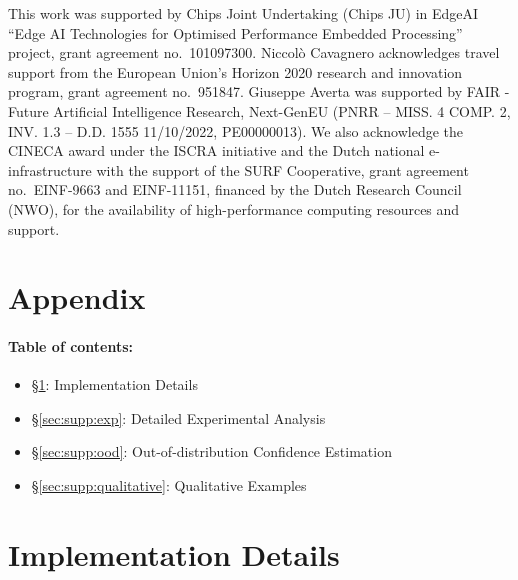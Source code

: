 \documentclass[10pt,twocolumn,letterpaper]{article}
\newcommand{\PAR}[1]{\vskip4pt \noindent {\bf #1~}}
\begin{document}
\footnotesize 
\PAR{Acknowledgements.}
This work was supported by Chips Joint Undertaking (Chips JU) in EdgeAI ``Edge AI Technologies for Optimised Performance Embedded Processing'' project, grant agreement no.~101097300.
Niccolò Cavagnero acknowledges travel support from the European Union’s Horizon 2020 research and innovation program, grant agreement no.~951847.
Giuseppe Averta was supported by FAIR - Future Artificial Intelligence Research, Next-GenEU (PNRR – MISS. 4 COMP. 2, INV. 1.3 – D.D. 1555 11/10/2022, PE00000013).
We also acknowledge the CINECA award under the ISCRA initiative and the Dutch national e-infrastructure with the support of the SURF Cooperative, grant agreement no.~EINF-9663 and EINF-11151, financed by the Dutch Research Council (NWO), for the availability of high-performance computing resources and support.

 


{
    \small
    
    
}

\clearpage
\appendix
\normalsize

\setcounter{table}{0}
\setcounter{figure}{0}

\renewcommand{\thetable}{\Alph{table}}
\renewcommand{\thesubtable}{\arabic{subtable}} 

\renewcommand{\thefigure}{\Alph{figure}}
\renewcommand{\thesubfigure}{\arabic{subfigure}} 

\appendix
\section*{Appendix}
\label{appendix}
\paragraph{Table of contents:}
\begin{itemize}[itemsep=-1pt,topsep=-1pt]
\item \S\ref{sec:supp:impl_details}: Implementation Details
\item \S\ref{sec:supp:exp}: Detailed Experimental Analysis
\item \S\ref{sec:supp:ood}: Out-of-distribution Confidence Estimation
\item \S\ref{sec:supp:qualitative}: Qualitative Examples
\end{itemize}

\section{Implementation Details}
\label{sec:supp:impl_details}
\end{document}
